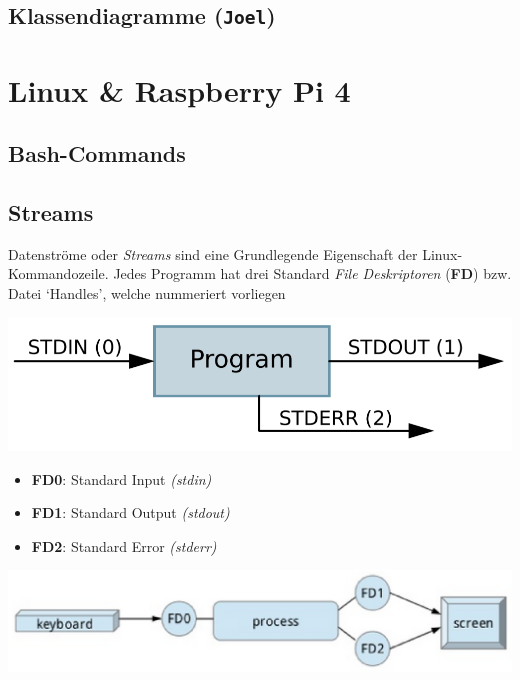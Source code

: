 \documentclass[
  9pt,
  a4paperpaper,
  DIV=11]{scrartcl}
\providecommand{\tightlist}{%
  \setlength{\itemsep}{0pt}\setlength{\parskip}{0pt}}\usepackage{longtable,booktabs,array}
\numberwithin{equation}{section}
\begin{document}
\begin{multicols}{2}
\hypertarget{klassendiagramme-joel}{%
\subsection{\texorpdfstring{Klassendiagramme
(\texttt{Joel})}{Klassendiagramme (Joel)}}\label{klassendiagramme-joel}}

\hypertarget{linux-raspberry-pi-4}{%
\section{Linux \& Raspberry Pi 4}\label{linux-raspberry-pi-4}}

\hypertarget{bash-commands}{%
\subsection{Bash-Commands}\label{bash-commands}}

\hypertarget{streams-1}{%
\subsection{Streams}\label{streams-1}}

Datenströme oder \emph{Streams} sind eine Grundlegende Eigenschaft der
Linux-Kommandozeile. Jedes Programm hat drei Standard \emph{File
Deskriptoren} (\textbf{FD}) bzw. Datei `Handles', welche nummeriert
vorliegen

\includegraphics{images/StandardIO_Redirection.png}

\begin{itemize}
\tightlist
\item
  \textbf{FD0}: Standard Input \emph{(stdin)}
\item
  \textbf{FD1}: Standard Output \emph{(stdout)}
\item
  \textbf{FD2}: Standard Error \emph{(stderr)}
\end{itemize}

\includegraphics{images/StandardIO_Overview.png}


\end{multicols}
\end{document}
